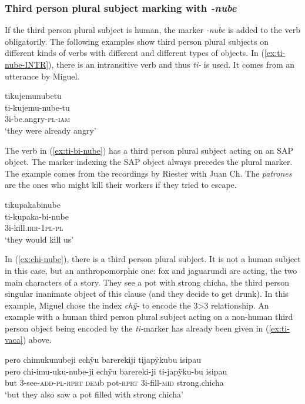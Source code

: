  \subsubsection{Third person plural subject marking with \textit{-nube}} If the third person plural subject is human, the marker \textit{-nube} is added to the verb obligatorily. The following examples show third person plural subjects on different kinds of verbs with different  and different types of objects. In (\ref{ex:ti-nube-INTR}), there is an intransitive verb and thus \textit{ti-} is used. It comes from an utterance by Miguel.
 
 
\ea\label{ex:ti-nube-INTR}
\begingl 
\glpreamble tikujemunubetu\\
\gla ti-kujemu-nube-tu\\ 
\glb 3i-be.angry-\textsc{pl}-\textsc{iam}\\ 
\glft ‘they were already angry’\\ 
\endgl
\trailingcitation{[jmx-c120429ls-x5.225]}
\xe

The verb in (\ref{ex:ti-bi-nube}) has a third person plural subject acting on an SAP object. The marker indexing the SAP object always precedes the plural marker. The example comes from the recordings by Riester with Juan Ch. The \textit{patrones} are the ones who might kill their workers if they tried to escape.

\ea\label{ex:ti-bi-nube}
\begingl 
\glpreamble tikupakabinube\\
\gla ti-kupaka-bi-nube\\ 
\glb 3i-kill.\textsc{irr}-1\textsc{pl}-\textsc{pl}\\ 
\glft ‘they would kill us’\\ 
\endgl
\trailingcitation{[nxx-p630101g-1.182]}
\xe

In (\ref{ex:chi-nube}), there is a third person plural subject. It is not a human subject in this case, but an anthropomorphic one: fox and jaguarundi are acting, the two main characters of a story. They see a pot with strong chicha, the third person singular inanimate object of this clause (and they decide to get drunk). In this example, Miguel chose the index \textit{chÿ-} to encode the 3>3 relationship. An example with a human third person plural subject acting on a non-human third person object being encoded by the \textit{ti-}marker has already been given in (\ref{ex:ti-vaca}) above.

\ea\label{ex:chi-nube}
\begingl 
\glpreamble pero chimukunubeji echÿu barerekiji tijapÿkubu isipau\\
\gla pero chi-imu-uku-nube-ji echÿu barereki-ji ti-japÿku-bu isipau\\ 
\glb but 3-see-\textsc{add}-\textsc{pl}-\textsc{rprt} \textsc{dem}b pot-\textsc{rprt} 3i-fill-\textsc{mid} strong.chicha\\ 
\glft ‘but they also saw a pot filled with strong chicha’\\ 
\endgl
\trailingcitation{[jmx-n120429ls-x5.328]}
\xe
{}



